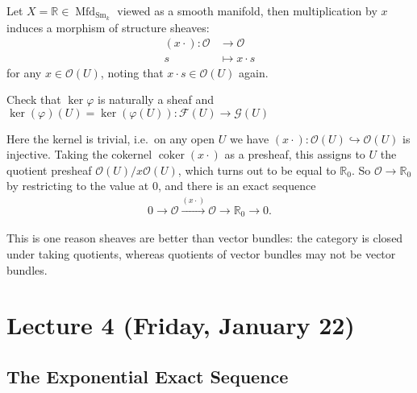 \begin{example}[of morphisms]

Let \(X = {\mathbb{R}}\in {\operatorname{Mfd}}_{\operatorname{Sm}_k}\)
viewed as a smooth manifold, then multiplication by \(x\) induces a
morphism of structure sheaves:
\begin{align*}
(x \cdot): {\mathcal{O}}&\to {\mathcal{O}}\\
s & \mapsto x\cdot s
\end{align*}
for any \(x\in {\mathcal{O}}(U)\), noting that
\(x\cdot s\in {\mathcal{O}}(U)\) again.

\begin{exercise}[?]

Check that \(\ker \varphi\) is naturally a sheaf and
\(\ker(\varphi)(U) = \ker (\varphi(U)): \mathcal{F}(U) \to \mathcal{G}(U)\)

\end{exercise}

Here the kernel is trivial, i.e.~on any open \(U\) we have
\((x\cdot):{\mathcal{O}}(U) \hookrightarrow{\mathcal{O}}(U)\) is
injective. Taking the cokernel \(\operatorname{coker}(x\cdot)\) as a
presheaf, this assigns to \(U\) the quotient presheaf
\({\mathcal{O}}(U) / x{\mathcal{O}}(U)\), which turns out to be equal to
\({\mathbb{R}}_0\). So \({\mathcal{O}}\to {\mathbb{R}}_0\) by
restricting to the value at \(0\), and there is an exact sequence
\begin{align*}
0 \to {\mathcal{O}}\xrightarrow{(x\cdot)} {\mathcal{O}}\to {\mathbb{R}}_0 \to 0
.\end{align*}

This is one reason sheaves are better than vector bundles: the category
is closed under taking quotients, whereas quotients of vector bundles
may not be vector bundles.

\end{example}

\hypertarget{lecture-4-friday-january-22}{%
\section{Lecture 4 (Friday, January
22)}\label{lecture-4-friday-january-22}}

\hypertarget{the-exponential-exact-sequence}{%
\subsection{The Exponential Exact
Sequence}\label{the-exponential-exact-sequence}}

